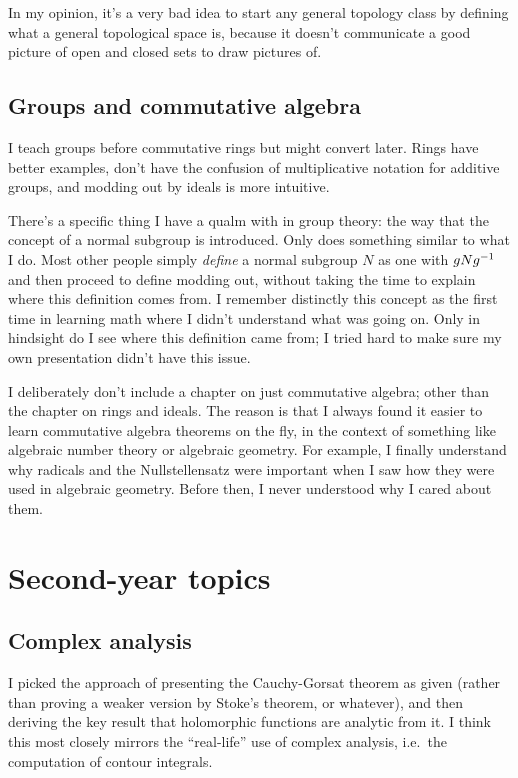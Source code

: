 In my opinion, it's a very bad idea to start any general topology class
by defining what a general topological space is,
because it doesn't communicate a good picture of open and closed sets
to draw pictures of.

\subsection*{Groups and commutative algebra}
I teach groups before commutative rings but might convert later.
Rings have better examples, don't have the confusion of multiplicative
notation for additive groups, and modding out by ideals is more intuitive.

There's a specific thing I have a qualm with in group theory:
the way that the concept of a normal subgroup is introduced.
Only \cite{ref:gowers} does something similar to what I do.
Most other people simply \emph{define} a normal subgroup $N$
as one with $gNg^{-1}$ and then proceed to define modding out,
without taking the time to explain where this definition comes from.
I remember distinctly this concept as the first time in learning math
where I didn't understand what was going on.
Only in hindsight do I see where this definition came from;
I tried hard to make sure my own presentation didn't have this issue.

I deliberately don't include a chapter on just commutative algebra;
other than the chapter on rings and ideals.
The reason is that I always found it easier to learn
commutative algebra theorems on the fly,
in the context of something like algebraic number theory or algebraic geometry.
For example, I finally understand why radicals and the Nullstellensatz were important
when I saw how they were used in algebraic geometry.
Before then, I never understood why I cared about them.


\section{Second-year topics}
\subsection*{Complex analysis}
I picked the approach of presenting the Cauchy-Gorsat theorem as given
(rather than proving a weaker version by Stoke's theorem, or whatever),
and then deriving the key result that holomorphic functions are analytic
from it.
I think this most closely mirrors the ``real-life'' use of complex
analysis, i.e.\ the computation of contour integrals.

